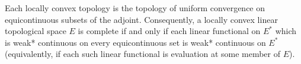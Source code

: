 Each locally convex topology is the topology of uniform convergence on equicontinuous subsets of the adjoint. Consequently, a locally convex linear topological space $E$ is complete if and only if each linear functional on $E^*$ which is weak* continuous on every equicontinuous set is weak* continuous on $E^*$ (equivalently, if each such linear functional is evaluation at some member of $E$).
